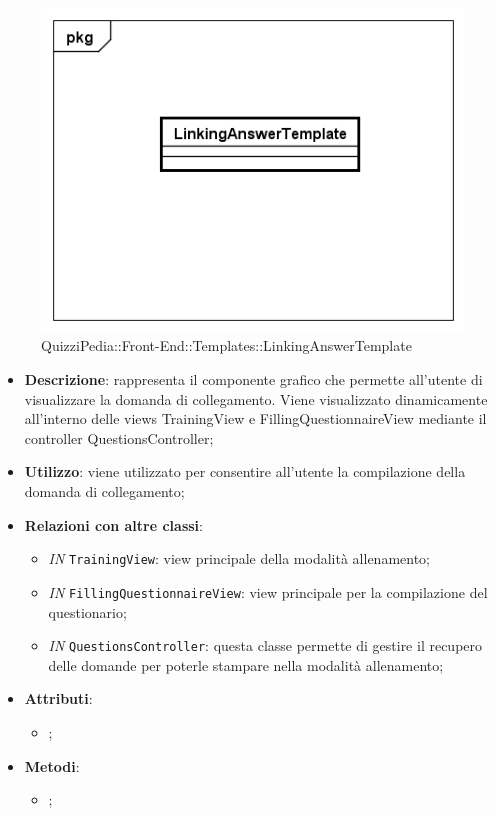 		\begin{figure}[ht]
			\centering
			\includegraphics[scale=0.5,keepaspectratio]{UML/Classi/Front-End/QuizziPedia_Front-end_Templates_LinkingAnswerTemplate.png}
			\caption{QuizziPedia::Front-End::Templates::LinkingAnswerTemplate}
		\end{figure} \FloatBarrier		
		
		\begin{itemize}
			\item \textbf{Descrizione}: rappresenta il componente grafico che permette all'utente di visualizzare la domanda di collegamento. Viene visualizzato dinamicamente all'interno delle views TrainingView e FillingQuestionnaireView mediante il controller QuestionsController;
			\item \textbf{Utilizzo}: viene utilizzato per consentire all'utente la compilazione della domanda di collegamento;
			\item \textbf{Relazioni con altre classi}: 
			\begin{itemize}
				\item \textit{IN} \texttt{TrainingView}: view principale della modalità allenamento; 
				\item \textit{IN} \texttt{FillingQuestionnaireView}: view principale per la compilazione del questionario;
				\item \textit{IN} \texttt{QuestionsController}: questa classe permette di gestire il recupero delle domande per poterle stampare nella modalità allenamento;
			\end{itemize}
			\item \textbf{Attributi}: 
			\begin{itemize}
				\item ;
			\end{itemize}
			\item \textbf{Metodi}: 
			\begin{itemize}
				\item ;
			\end{itemize}
		\end{itemize}
		
